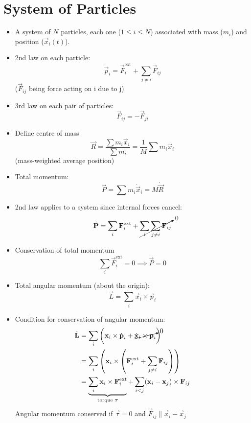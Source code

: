 \section{System of Particles}
\begin{itemize}

      \item A system of $N$ particles, each one ($1 \leq i \leq N$) associated with mass ($m_i$) and position ($\vec{x}_i(t)$).
      \item 2nd law on each particle: \[\dot{\vec{p}}_i = \vec{F}^{\text{ext}}_i + \sum_{j\neq i} \vec{F}_{ij} \] ($\vec{F}_{ij}$ being force acting on i due to j)
      \item 3rd law on each pair of particles: \[\vec{F}_{ij} = -\vec{F}_{ji}\]
      \item Define centre of mass \[ \vec{R} = \frac{\sum m_i \vec{x}_i}{\sum m_i} = \frac{1}{M} \sum m_i \vec{x}_i \]
            (mass-weighted average position)
      \item Total momentum: \[\vec{P} = \sum m_i \dot{\vec{x}}_i = M \dot{\vec{R}} \]
      \item 2nd law applies to a system since internal forces cancel:
            \[ \dot{\vec{P}} = \sum_i \vec{F}^{\text{ext}}_i + \cancelto{0}{\sum_i \sum_{j\neq i} \vec{F}_{ij}} \]
      \item Conservation of total momentum \[ \sum_i \vec{F}^{\text{ext}}_i = 0 \implies \dot{\vec{P}} = 0 \]
      \item Total angular momentum (about the origin):
            \[\vec{L} = \sum_i \vec{x}_i \times \vec{p}_i\]
      \item Condition for conservation of angular momentum:
            \begin{align*}
                  \dot{\vec{L}} & = \sum_i \left( \vec{x}_i \times \dot{\vec{p}}_i + \cancelto{0}{\dot{\vec{x}}_i \times \vec{p}_i} \right)                                        \\
                                & = \sum_i \left( \vec{x}_i \times \left(\vec{F}^{\text{ext}}_i + \sum_{j\neq i} \vec{F}_{ij}\right) \right)                                       \\
                                & = \underbrace{\sum_i \vec{x}_i \times \vec{F}^{\text{ext}}_i}_{\text{torque } \vec{\tau}} + \sum_{i<j} (\vec{x}_i-\vec{x}_j) \times \vec{F}_{ij}
            \end{align*}
            Angular momentum conserved if $ \vec{\tau} =0$ and $\vec{F}_{ij} \parallel \vec{x}_i-\vec{x}_j$

\end{itemize}
